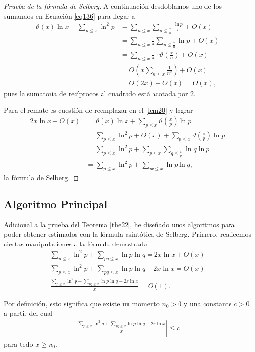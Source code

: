 \begin{proof}[Prueba de la f\'ormula de Selberg]
A continuaci\'on desdoblamos uno de los sumandos en Ecuaci\'on \ref{eq136} para llegar a 
\begin{align}
\vartheta(x)\ln x - \sum_{p \leq x} \ln^2 p &= \sum_{n \leq x} \sum_{p \leq \frac{x}{n}} \frac{\ln p}{n} + O(x) \\
&= \sum_{n \leq x} \frac{1}{n}\sum_{p \leq \frac{x}{n}} \ln p + O(x) \\
&= \sum_{n \leq x} \frac{1}{n}\cdot \vartheta\left(\frac{x}{n}\right) + O(x) \\
&= O\left(x \sum_{n \leq x} \frac{1}{n^2}\right) + O(x) \\
&= O(2x)+O(x)=O(x), 
\end{align}
pues la sumatoria de rec\'iprocos al cuadrado est\'a acotada por $2$. 

Para el remate es cuesti\'on de reemplazar en el \cref{lem20} y lograr  
\begin{align}
2x\ln x + O(x) &= \vartheta(x)\ln x + \sum_{p \leq x} \vartheta\left(\frac{x}{p}\right)\ln p  \\
&= \sum_{p \leq x} \ln^2 p + O(x) + \sum_{p \leq x} \vartheta\left(\frac{x}{p}\right)\ln p  \\
&= \sum_{p \leq x} \ln^2 p + \sum_{p \leq x} \sum_{q \leq \frac{x}{p}} \ln q \ln p  \\
&= \sum_{p \leq x} \ln^2 p + \sum_{pq \leq x} \ln p \ln q, 
\end{align}
la f\'ormula de Selberg.
\end{proof}

\subsection{Algoritmo Principal}
Adicional a la prueba del Teorema \ref{the22}, he dise\~nado unos algoritmos para poder obtener estimados
con la f\'ormula asint\'otica de Selberg. Primero, realicemos ciertas manipulaciones a la f\'ormula demostrada
\begin{gather}
\sum_{p \leq x} \ln^2 p + \sum_{pq \leq x} \ln p \ln q = 2x\ln x + O(x) \\
\sum_{p \leq x} \ln^2 p + \sum_{pq \leq x} \ln p \ln q - 2x\ln x = O(x) \\
\frac{\sum_{p \leq x} \ln^2 p + \sum_{pq \leq x} \ln p \ln q - 2x\ln x}{x} = O(1).
\end{gather}

Por definici\'on, esto significa que existe un momento $n_0 > 0$ y una constante $c > 0$ a partir del cual
\begin{align}
\left|\frac{\sum_{p \leq x} \ln^2 p + \sum_{pq \leq x} \ln p \ln q - 2x\ln x}{x}\right| \leq c
\end{align}
para todo $x \geq n_0$.

